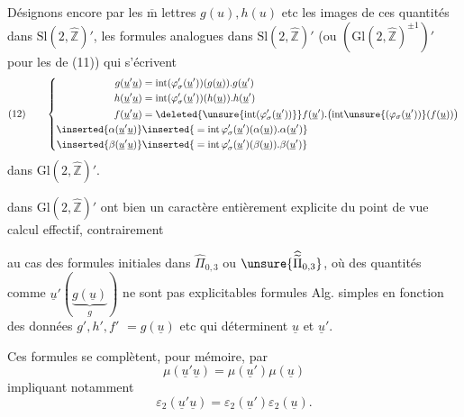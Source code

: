 Désignons encore par les $\overline{\mathrm m}$ lettres $g(u),h(u)$ etc les images de ces quantités dans $\mathrm{Sl}(2,\widehat{\mathbb Z})'$,  les formules analogues dans $\mathrm{Sl}(2,\widehat{\mathbb Z})'$ (ou $(\mathrm{Gl}(2,\widehat{\mathbb Z})^{\pm1})'$ pour  les  de (11)) qui s'écrivent
\[
(12)\qquad\left\{\begin{aligned}
g(\underline u'\underline u)&=\mathrm{int}(\varphi_\sigma'(\underline u'))(g(\underline u)).g(\underline u')\\
h(\underline u'\underline u)&=\mathrm{int}(\varphi_\sigma'(\underline u'))(h(\underline u)).h(\underline u')\\
f(\underline u'\underline u)&=\deleted{\unsure{\mathrm{int}(\varphi_\sigma'(\underline u'))}}f(\underline u').\bigl(\mathrm{int}\unsure{(\varphi_\sigma(\underline u'))}(f(\underline u))\bigr)\\
\inserted{\alpha(\underline u'\underline u)}&\inserted{{}=\mathrm{int}\,\varphi_\sigma'(\underline u')(\alpha(\underline u)).\alpha(\underline u')}\\
\inserted{\beta(\underline u'\underline u)}&\inserted{{}=\mathrm{int}\,\varphi_\sigma'(\underline u')(\beta(\underline u)).\beta(\underline u')}
\end{aligned}\right.
\]
dans $\mathrm{Gl}(2,\widehat{\mathbb Z})'$.

 dans $\mathrm{Gl}(2,\widehat{\mathbb Z})'$ ont bien un caractère entièrement explicite du point de vue calcul effectif, contrairement


au cas des formules initiales dans $\widehat{\Pi}_{0,3}$ ou $\unsure{\widehat{\widetilde{\Pi}}_{0,3}}$, où des quantités comme $\underline{u}'(\underbrace{g(\underline{u})}_{g})$ ne sont pas explicitables   formules Alg. simples en fonction des données  $g',h',f'$  $=g(\underline{u})$ etc qui déterminent $\underline{u}$ et $\underline{u}'$.

Ces formules se complètent, pour mémoire, par
\[
\tag{13}
\mu(\underline{u}'\underline{u})=\mu(\underline{u}')\mu(\underline{u})
\]
impliquant notamment
\[
\tag{14}
\varepsilon_2(\underline{u}'\underline{u})=\varepsilon_2(\underline{u}')\varepsilon_2(\underline{u}).
\]


